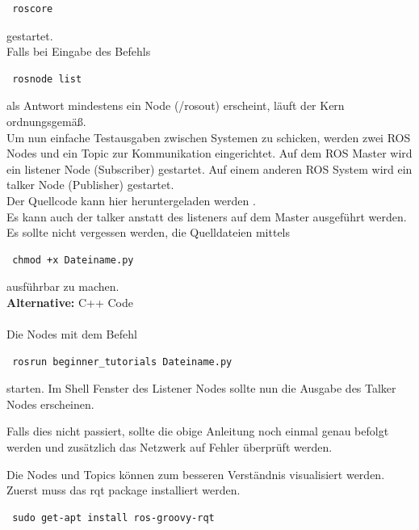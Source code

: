 \documentclass[12pt]{article}
\begin{document}
 \begin{lstlisting}
 roscore
 \end{lstlisting}

gestartet. \\
Falls bei Eingabe des Befehls

 \begin{lstlisting}
 rosnode list
 \end{lstlisting}

als Antwort mindestens ein Node (/rosout) erscheint, läuft der Kern ordnungsgemäß. \\
Um nun einfache Testausgaben zwischen Systemen zu schicken, werden zwei ROS Nodes und ein Topic zur Kommunikation eingerichtet.
Auf dem ROS Master wird ein listener Node (Subscriber) gestartet.
Auf einem anderen ROS System wird ein talker Node (Publisher) gestartet. \\ Der Quellcode kann hier heruntergeladen werden \cite{PythonCode}.  \\
Es kann auch der talker anstatt des listeners auf dem Master ausgeführt werden. \\
Es sollte nicht vergessen werden, die Quelldateien mittels

 \begin{lstlisting}
 chmod +x Dateiname.py
 \end{lstlisting}

ausführbar zu machen. \\
{\bf Alternative:} C++ Code \cite{C++Code} \\
\\
Die Nodes mit dem Befehl 

 \begin{lstlisting}
 rosrun beginner_tutorials Dateiname.py
 \end{lstlisting}
 
starten.
Im Shell Fenster des Listener Nodes sollte nun die Ausgabe des Talker Nodes erscheinen.

Falls dies nicht passiert, sollte die obige Anleitung noch einmal genau befolgt werden und zusätzlich das Netzwerk auf Fehler überprüft werden.
\cite{NetworkSetup}

Die Nodes und Topics können zum besseren Verständnis visualisiert werden.
Zuerst muss das rqt package installiert werden.

 \begin{lstlisting}
 sudo get-apt install ros-groovy-rqt
 \end{lstlisting}
\end{document}
